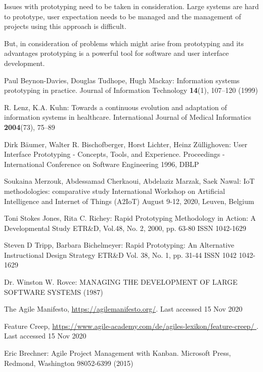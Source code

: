 \documentclass[runningheads]{llncs}
\begin{document}
Issues with prototyping need to be taken in consideration. Large systems are hard to prototype, user expectation needs to be managed and the 
management of projects using this approach is difficult.

But, in consideration of problems which might arise from prototyping and its advantages prototyping is a powerful tool for software and user interface
development.


%
%
%
% 
% 
%
\begin{thebibliography}{8}

Paul Beynon-Davies, Douglas Tudhope, Hugh Mackay: Information systems prototyping in practice. 
Journal of Information Technology  \textbf{14}(1), 107--120 (1999) 

R. Lenz, K.A. Kuhn: Towards a continuous evolution and adaptation of
information systems in healthcare. 
International Journal of Medical Informatics   \textbf{2004}(73), 75--89

Dirk Bäumer, Walter R. Bischofberger, Horst Lichter, Heinz Züllighoven: User Interface Prototyping - Concepts, Tools, and Experience.
Proceedings - International Conference on Software Engineering 1996, DBLP 

Soukaina Merzouk, Abdessamad Cherkaoui, Abdelaziz Marzak, Saek Nawal: IoT methodologies: comparative study
International Workshop on Artificial Intelligence and Internet of Things (A2IoT) August 9-12, 2020, Leuven, Belgium

Toni Stokes Jones, Rita C. Richey: Rapid Prototyping Methodology in Action: A Developmental Study
ETR\&D, Vol.48, No. 2, 2000, pp. 63-80 ISSN 1042-1629

Steven D Tripp, Barbara Bichelmeyer: Rapid Prototyping: An Alternative Instructional Design Strategy
ETR\&D Vol. 38, No. 1, pp. 31-44 ISSN 1042 1042-1629

Dr. Winston W. Rovce: MANAGING THE DEVELOPMENT OF LARGE SOFTWARE SYSTEMS (1987)

The Agile Manifesto, \url{https://agilemanifesto.org/}. Last accessed 15
Nov 2020

Feature Creep, \url{https://www.agile-academy.com/de/agiles-lexikon/feature-creep/
}. Last accessed 15
Nov 2020

Eric Brechner: Agile Project Management with Kanban. Microsoft Press,
Redmond, Washington 98052-6399 (2015)

\end{thebibliography} 
\end{document}
